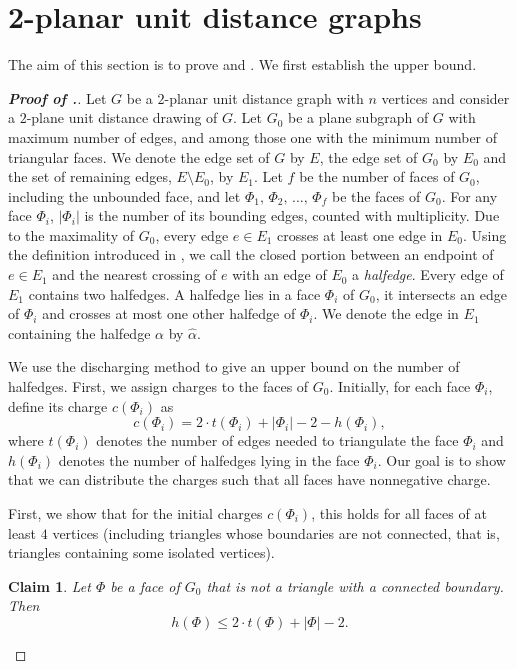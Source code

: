 \documentclass[10pt]{article}
\newtheorem{claim}{Claim}
\theoremstyle{definition}
\begin{document}
\section{2-planar unit distance graphs}

The aim of this section is to prove  and . We first establish the upper bound.

\begin{proof}[\bf Proof of .]
Let $G$ be a $2$-planar unit distance graph with $n$ vertices and consider a $2$-plane unit distance drawing of $G$. Let $G_0$ be a plane subgraph of $G$ with maximum number of edges, and among those one with the minimum number of triangular faces. We denote the edge set of $G$ by $E$, the edge set of $G_0$ by $E_0$ and the set of remaining edges, $E\setminus E_0$, by $E_1$.
Let $f$ be the number of faces of $G_0$, including the unbounded face, and let $\Phi_1, \, \Phi_2, \, \dots, \, \Phi_f$ be the faces of $G_0$. For any face $\Phi_i$, $|\Phi_i|$ is the number of its bounding edges, counted with multiplicity. 
Due to the maximality of $G_0$, every edge $e \in E_1$ crosses at least one edge in $E_0$.
Using the definition introduced in \cite{PT97}, we call
the closed portion between an endpoint of $e \in E_1$ and the nearest crossing of $e$ with an edge of $E_0$ a \emph{halfedge}. 
Every edge of $E_1$ contains two halfedges. A halfedge lies in a face $\Phi_i$ of $G_0$, it intersects an edge of $\Phi_i$ and crosses at most one other halfedge of $\Phi_i$. We denote the edge in $E_1$ containing the halfedge $\alpha$ by $\widehat{\alpha}$.

We use the discharging method to give an upper bound 
on the number of halfedges. First, we assign charges to the faces of $G_0$. Initially, for each face $\Phi_i$, define its charge 
$c(\Phi_i)$ as
$$c(\Phi_i)= 2 \cdot t(\Phi_i) + |\Phi_i| -2-h(\Phi_i),$$
where $t(\Phi_i)$ denotes the number of 
edges needed to triangulate the face $\Phi_i$ and $h(\Phi_i)$ denotes the number of halfedges lying in the face $\Phi_i$.
Our goal is to show that we can distribute the charges such that all faces have nonnegative charge.


First, we show  that for the initial charges $c(\Phi_i)$, 
this holds for all faces of at least $4$ vertices (including triangles whose 
boundaries are not connected, that is, triangles containing some isolated vertices).

\begin{claim} \label{claim_halfedges}
Let $\Phi$ be a face of $G_0$ that is not a triangle with a connected boundary. Then
$$h(\Phi) \leq 2 \cdot t(\Phi) + |\Phi| -2.$$
\end{claim}


\end{proof}
\end{document}

